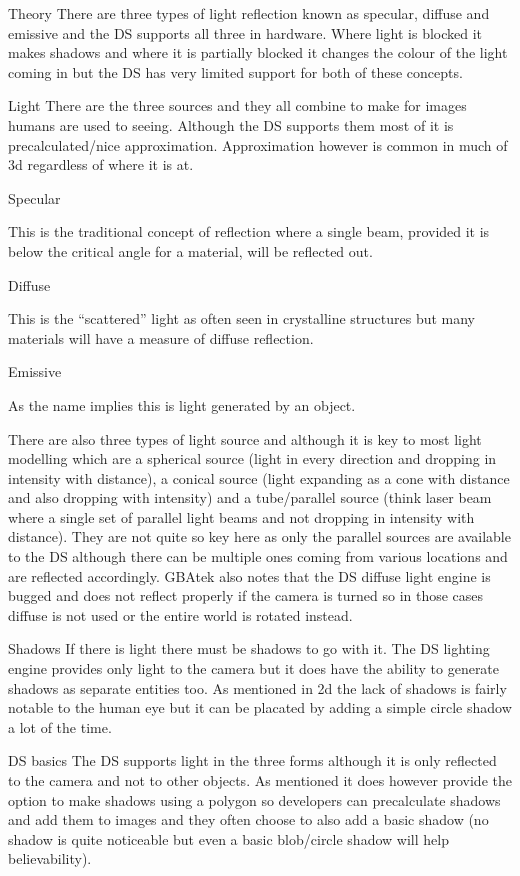 \documentclass[
]{book}
\begin{document}
Theory There are three types of light reflection known as specular, diffuse and emissive and the DS supports all three in hardware. Where light is blocked it makes shadows and where it is partially blocked it changes the colour of the light coming in but the DS has very limited support for both of these concepts.

Light There are the three sources and they all combine to make for images humans are used to seeing. Although the DS supports them most of it is precalculated/nice approximation. Approximation however is common in much of 3d regardless of where it is at.

Specular

This is the traditional concept of reflection where a single beam, provided it is below the critical angle for a material, will be reflected out.

Diffuse

This is the ``scattered'' light as often seen in crystalline structures but many materials will have a measure of diffuse reflection.

Emissive

As the name implies this is light generated by an object.

There are also three types of light source and although it is key to most light modelling which are a spherical source (light in every direction and dropping in intensity with distance), a conical source (light expanding as a cone with distance and also dropping with intensity) and a tube/parallel source (think laser beam where a single set of parallel light beams and not dropping in intensity with distance). They are not quite so key here as only the parallel sources are available to the DS although there can be multiple ones coming from various locations and are reflected accordingly. GBAtek also notes that the DS diffuse light engine is bugged and does not reflect properly if the camera is turned so in those cases diffuse is not used or the entire world is rotated instead.

Shadows If there is light there must be shadows to go with it. The DS lighting engine provides only light to the camera but it does have the ability to generate shadows as separate entities too. As mentioned in 2d the lack of shadows is fairly notable to the human eye but it can be placated by adding a simple circle shadow a lot of the time.

DS basics The DS supports light in the three forms although it is only reflected to the camera and not to other objects. As mentioned it does however provide the option to make shadows using a polygon so developers can precalculate shadows and add them to images and they often choose to also add a basic shadow (no shadow is quite noticeable but even a basic blob/circle shadow will help believability).
\end{document}

